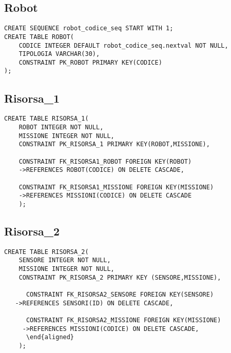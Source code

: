 \begin{description}
\subsection{Robot}
\begin{verbatim}
CREATE SEQUENCE robot_codice_seq START WITH 1;
CREATE TABLE ROBOT(
    CODICE INTEGER DEFAULT robot_codice_seq.nextval NOT NULL,
    TIPOLOGIA VARCHAR(30),
    CONSTRAINT PK_ROBOT PRIMARY KEY(CODICE)
);
\end{verbatim}

\subsection{Risorsa_1}
\begin{verbatim}
CREATE TABLE RISORSA_1(
    ROBOT INTEGER NOT NULL,
    MISSIONE INTEGER NOT NULL,
    CONSTRAINT PK_RISORSA_1 PRIMARY KEY(ROBOT,MISSIONE),

    CONSTRAINT FK_RISORSA1_ROBOT FOREIGN KEY(ROBOT)
    ->REFERENCES ROBOT(CODICE) ON DELETE CASCADE,
    
    CONSTRAINT FK_RISORSA1_MISSIONE FOREIGN KEY(MISSIONE) 
    ->REFERENCES MISSIONI(CODICE) ON DELETE CASCADE
    );
\end{verbatim}

\subsection{Risorsa_2}
\begin{verbatim}
CREATE TABLE RISORSA_2(
    SENSORE INTEGER NOT NULL,
    MISSIONE INTEGER NOT NULL,
    CONSTRAINT PK_RISORSA_2 PRIMARY KEY (SENSORE,MISSIONE),
     
      CONSTRAINT FK_RISORSA2_SENSORE FOREIGN KEY(SENSORE)
   ->REFERENCES SENSORI(ID) ON DELETE CASCADE,

      CONSTRAINT FK_RISORSA2_MISSIONE FOREIGN KEY(MISSIONE)
     ->REFERENCES MISSIONI(CODICE) ON DELETE CASCADE,
      \end{aligned}     
    );
\end{verbatim}
\end{description}


